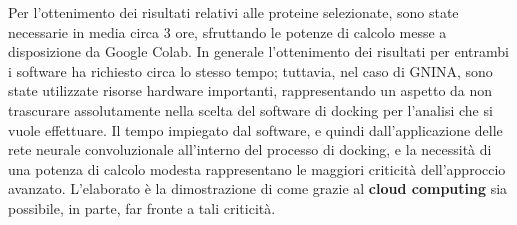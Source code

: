 Per l'ottenimento dei risultati relativi alle proteine selezionate, sono state necessarie in media circa 3 ore, sfruttando le potenze di calcolo messe a disposizione da Google Colab. 
In generale l'ottenimento dei risultati per entrambi i software ha richiesto circa lo stesso tempo; tuttavia, nel caso di GNINA, sono state utilizzate risorse hardware importanti, rappresentando un aspetto da non trascurare assolutamente nella scelta del software di docking per l'analisi che si vuole effettuare. Il tempo impiegato dal software, e quindi dall'applicazione delle rete neurale convoluzionale all'interno del processo di docking, e la necessità di una potenza di calcolo modesta rappresentano le maggiori criticità dell'approccio avanzato. L'elaborato è la dimostrazione di come grazie al 
\textbf{cloud computing} sia possibile, in parte, far fronte a tali criticità.



















